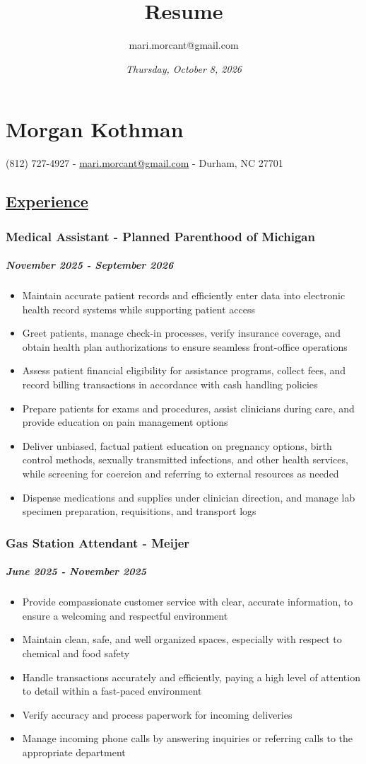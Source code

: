 \documentclass[11pt]{article}
\author{mari.morcant@gmail.com}
\date{\textit{Thursday, October  8, 2026}}
\title{Resume}
\begin{document}
\section*{Morgan Kothman}
\label{sec:org253647d}
(812) 727-4927 -
\href{mailto:mari.morcant@gmail.com}{mari.morcant@gmail.com} - Durham, NC 27701
\subsection*{\underline{Experience}}
\label{sec:org982937e}
\subsubsection*{Medical Assistant - Planned Parenthood of Michigan}
\label{sec:org5ca58c6}
\subparagraph*{\emph{November 2025 - September 2026}}
\label{sec:org6a1a86b}
\begin{itemize}
\item Maintain accurate patient records and efficiently enter data
into electronic health record systems while supporting
patient access
\item Greet patients, manage check-in processes, verify insurance
coverage, and obtain health plan authorizations to ensure
seamless front-office operations
\item Assess patient financial eligibility for assistance programs,
collect fees, and record billing transactions in accordance with
cash handling policies
\item Prepare patients for exams and procedures, assist clinicians
during care, and provide education on pain management options
\item Deliver unbiased, factual patient education on pregnancy options,
birth control methods, sexually transmitted infections, and other
health services, while screening for coercion and referring to external
resources as needed
\item Dispense medications and supplies under clinician direction, and
manage lab specimen preparation, requisitions, and transport logs
\end{itemize}
\subsubsection*{Gas Station Attendant - Meijer}
\label{sec:org5003668}
\subparagraph*{\emph{June 2025 - November 2025}}
\label{sec:org89562f4}
\begin{itemize}
\item Provide compassionate customer service with clear, accurate
information, to ensure a welcoming and respectful environment
\item Maintain clean, safe, and well organized spaces, especially with
respect to chemical and food safety
\item Handle transactions accurately and efficiently, paying a high level
of attention to detail within a fast-paced environment
\item Verify accuracy and process paperwork for incoming deliveries
\item Manage incoming phone calls by answering inquiries or referring
calls to the appropriate department
\end{itemize}
\end{document}
